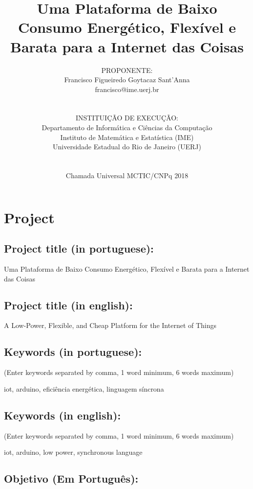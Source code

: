 \documentclass[titlepage,12pt]{article}
\title{ Uma Plataforma de Baixo Consumo Energético, Flexível e Barata para a
        Internet das Coisas }
\author{PROPONENTE:                                     \\
Francisco Figueiredo Goytacaz Sant'Anna                 \\
francisco@ime.uerj.br                                   \\
\\\\
INSTITUIÇÃO DE EXECUÇÃO:                                \\
Departamento de Informática e Ciências da Computação    \\
Instituto de Matemática e Estatística (IME)             \\
Universidade Estadual do Rio de Janeiro (UERJ)          \\
\\\\
Chamada Universal MCTIC/CNPq 2018 
}
\begin{document}
 

\maketitle


\section{Project}

\subsection{ Project title (in portuguese): }

Uma Plataforma de Baixo Consumo Energético, Flexível e Barata para a Internet
das Coisas

\subsection{ Project title (in english): }

A Low-Power, Flexible, and Cheap Platform for the Internet of Things

\subsection{ Keywords (in portuguese): }

(Enter keywords separated by comma, 1 word minimum, 6 words maximum)

iot, arduino, eficiência energética, linguagem síncrona

\subsection{ Keywords (in english): }

(Enter keywords separated by comma, 1 word minimum, 6 words maximum)

iot, arduino, low power, synchronous language

\subsection{ Objetivo (Em Português): }

\end{document}
